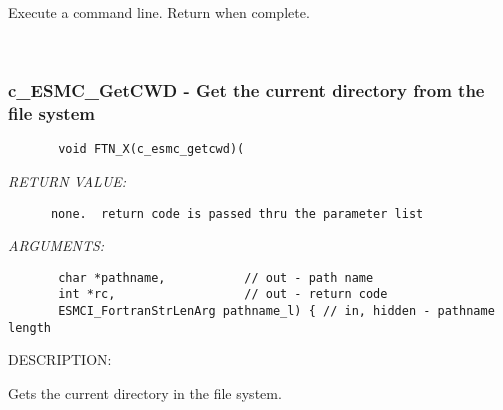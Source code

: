        Execute a command line.  Return when complete.
   
 
\mbox{}\hrulefill\
 
\subsubsection [c\_ESMC\_GetCWD] {c\_ESMC\_GetCWD - Get the current directory from the file system}


  
\begin{verbatim}       void FTN_X(c_esmc_getcwd)(\end{verbatim}{\em RETURN VALUE:}
\begin{verbatim}      none.  return code is passed thru the parameter list\end{verbatim}{\em ARGUMENTS:}
\begin{verbatim}       char *pathname,           // out - path name
       int *rc,                  // out - return code
       ESMCI_FortranStrLenArg pathname_l) { // in, hidden - pathname length\end{verbatim}
{\sf DESCRIPTION:\\ }


       Gets the current directory in the file system.
  
\setlength{\parskip}{\oldparskip}
\setlength{\parindent}{\oldparindent}
\setlength{\baselineskip}{\oldbaselineskip}
